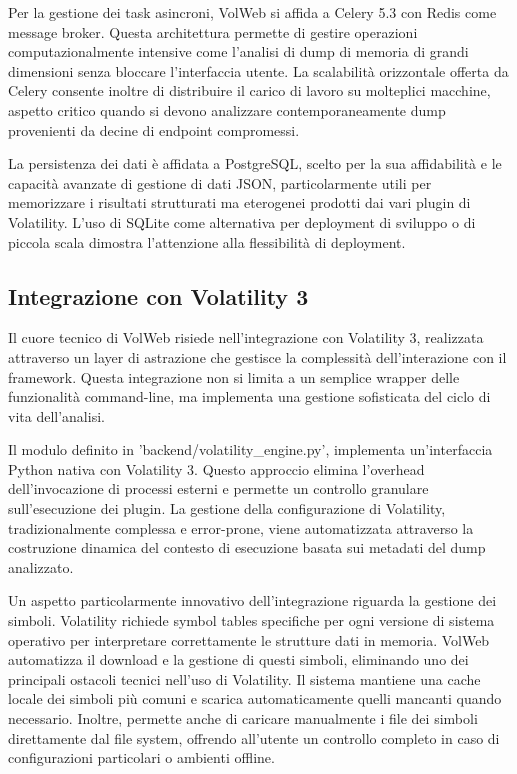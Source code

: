 Per la gestione dei task asincroni, VolWeb si affida a Celery 5.3 con Redis come message broker. Questa architettura permette di gestire operazioni computazionalmente intensive come l'analisi di dump di memoria di grandi dimensioni senza bloccare l'interfaccia utente. La scalabilità orizzontale offerta da Celery consente inoltre di distribuire il carico di lavoro su molteplici macchine, aspetto critico quando si devono analizzare contemporaneamente dump provenienti da decine di endpoint compromessi.

La persistenza dei dati è affidata a PostgreSQL, scelto per la sua affidabilità e le capacità avanzate di gestione di dati JSON, particolarmente utili per memorizzare i risultati strutturati ma eterogenei prodotti dai vari plugin di Volatility. L'uso di SQLite come alternativa per deployment di sviluppo o di piccola scala dimostra l'attenzione alla flessibilità di deployment.

\subsection{Integrazione con Volatility 3}

Il cuore tecnico di VolWeb risiede nell'integrazione con Volatility 3, realizzata attraverso un layer di astrazione che gestisce la complessità dell'interazione con il framework. Questa integrazione non si limita a un semplice wrapper delle funzionalità command-line, ma implementa una gestione sofisticata del ciclo di vita dell'analisi.

Il modulo definito in 'backend/volatility\_engine.py', implementa un'interfaccia Python nativa con Volatility 3. Questo approccio elimina l'overhead dell'invocazione di processi esterni e permette un controllo granulare sull'esecuzione dei plugin. La gestione della configurazione di Volatility, tradizionalmente complessa e error-prone, viene automatizzata attraverso la costruzione dinamica del contesto di esecuzione basata sui metadati del dump analizzato.

Un aspetto particolarmente innovativo dell'integrazione riguarda la gestione dei simboli. Volatility richiede symbol tables specifiche per ogni versione di sistema operativo per interpretare correttamente le strutture dati in memoria. VolWeb automatizza il download e la gestione di questi simboli, eliminando uno dei principali ostacoli tecnici nell'uso di Volatility. Il sistema mantiene una cache locale dei simboli più comuni e scarica automaticamente quelli mancanti quando necessario. Inoltre, permette anche di caricare manualmente i file dei simboli direttamente dal file system, offrendo all'utente un controllo completo in caso di configurazioni particolari o ambienti offline.

